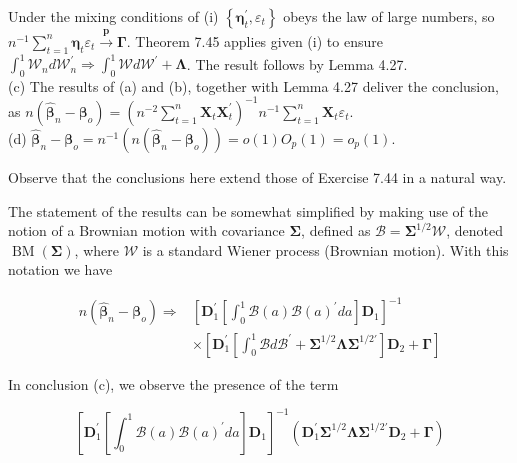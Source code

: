 \documentclass[10pt]{article}
\begin{document}
Under the mixing conditions of (i) $\left\{\boldsymbol{\eta}_{t}^{\prime}, \varepsilon_{t}\right\}$ obeys the law of large numbers, so $n^{-1} \sum_{t=1}^{n} \boldsymbol{\eta}_{t} \varepsilon_{t} \xrightarrow{\boldsymbol{p}} \boldsymbol{\Gamma}$. Theorem 7.45 applies given (i) to ensure $\int_{0}^{1} \mathcal{W}_{n} d \mathcal{W}_{n}^{\prime} \Rightarrow \int_{0}^{1} \mathcal{W} d \mathcal{W}^{\prime}+\boldsymbol{\Lambda}$. The result follows by Lemma 4.27.\\
(c) The results of (a) and (b), together with Lemma 4.27 deliver the conclusion, as $n\left(\hat{\boldsymbol{\beta}}_{n}-\boldsymbol{\beta}_{o}\right)=\left(n^{-2} \sum_{t=1}^{n} \mathbf{X}_{t} \mathbf{X}_{t}^{\prime}\right)^{-1} n^{-1} \sum_{t=1}^{n} \mathbf{X}_{t} \varepsilon_{t}$.\\
(d) $\hat{\boldsymbol{\beta}}_{n}-\boldsymbol{\beta}_{o}=n^{-1}\left(n\left(\hat{\boldsymbol{\beta}}_{n}-\boldsymbol{\beta}_{o}\right)\right)=o(1) O_{p}(1)=o_{p}(1)$.

Observe that the conclusions here extend those of Exercise 7.44 in a natural way.

The statement of the results can be somewhat simplified by making use of the notion of a Brownian motion with covariance $\boldsymbol{\Sigma}$, defined as $\mathcal{B}=\boldsymbol{\Sigma}^{1 / 2} \mathcal{W}$, denoted $\operatorname{BM}(\boldsymbol{\Sigma})$, where $\mathcal{W}$ is a standard Wiener process (Brownian motion). With this notation we have

$$
\begin{aligned}
n\left(\hat{\boldsymbol{\beta}}_{n}-\boldsymbol{\beta}_{o}\right) \Rightarrow & {\left[\mathbf{D}_{1}^{\prime}\left[\int_{0}^{1} \mathcal{B}(a) \mathcal{B}(a)^{\prime} d a\right] \mathbf{D}_{1}\right]^{-1} } \\
& \times\left[\mathbf{D}_{1}^{\prime}\left[\int_{0}^{1} \mathcal{B} d \mathcal{B}^{\prime}+\boldsymbol{\Sigma}^{1 / 2} \boldsymbol{\Lambda} \boldsymbol{\Sigma}^{1 / 2 \prime}\right] \mathbf{D}_{2}+\boldsymbol{\Gamma}\right]
\end{aligned}
$$

In conclusion (c), we observe the presence of the term

$$
\left[\mathbf{D}_{1}^{\prime}\left[\int_{0}^{1} \mathcal{B}(a) \mathcal{B}(a)^{\prime} d a\right] \mathbf{D}_{1}\right]^{-1}\left(\mathbf{D}_{1}^{\prime} \boldsymbol{\Sigma}^{1 / 2} \boldsymbol{\Lambda} \boldsymbol{\Sigma}^{1 / 2 \prime} \mathbf{D}_{2}+\boldsymbol{\Gamma}\right)
$$
\end{document}
